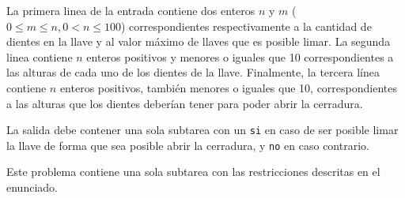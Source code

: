 \documentclass{oci}
\begin{document}
\begin{inputDescription}
La primera linea de la entrada contiene dos enteros $n$ y $m$ ($0 \leq m \leq n, 0 < n \leq 100$) correspondientes
respectivamente a la cantidad de dientes en la llave y al valor máximo de llaves
que es posible limar.
La segunda linea contiene $n$ enteros positivos y menores o iguales que 10
correspondientes a las alturas de cada uno de los dientes de la llave.
Finalmente, la tercera línea contiene $n$ enteros positivos, también menores o iguales que 10,
correspondientes a las alturas que los
dientes deberían tener para poder abrir la cerradura.
\end{inputDescription}

\begin{outputDescription}
La salida debe contener una sola subtarea con un \verb|si| en caso de ser posible
limar la llave de forma que sea posible abrir la cerradura, y \verb|no| en caso contrario.
\end{outputDescription}

\begin{scoreDescription}
     Este problema contiene una sola subtarea con las restricciones descritas
    en el enunciado.
\end{scoreDescription}

\begin{sampleDescription}
\end{sampleDescription}
\end{document}
